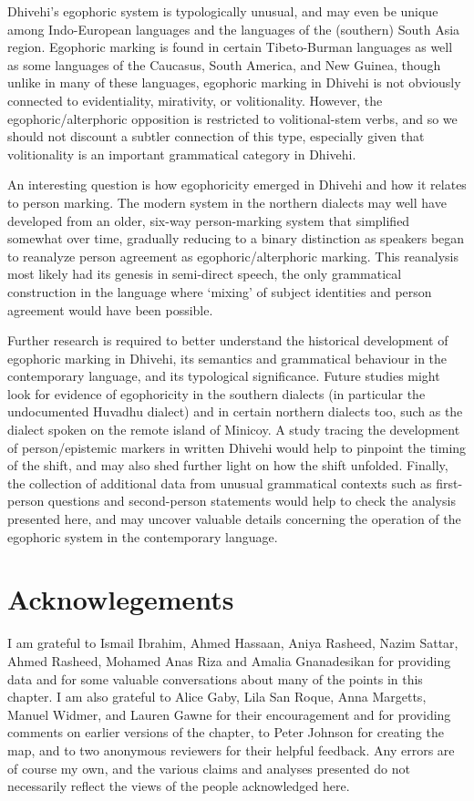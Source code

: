 \documentclass[output=paper]{langsci/langscibook}
\begin{document}
Dhivehi’s egophoric system is typologically unusual, and may even be unique among Indo-European languages and the languages of the (southern) South Asia region. Egophoric marking is found in certain Tibeto-Burman languages as well as some languages of the Caucasus, South America, and New Guinea, though unlike in many of these languages, egophoric marking in Dhivehi is not obviously connected to evidentiality, mirativity, or volitionality. However, the egophoric/alterphoric opposition is restricted to volitional-stem verbs, and so we should not discount a subtler connection of this type, especially given that volitionality is an important grammatical category in Dhivehi.

An interesting question is how egophoricity emerged in Dhivehi and how it relates to person marking. The modern system in the northern dialects may well have developed from an older, six-way person-marking system that simplified somewhat over time, gradually reducing to a binary distinction as speakers began to reanalyze person agreement as egophoric/alterphoric marking. This reanalysis most likely had its genesis in semi-direct speech, the only grammatical construction in the language where ‘mixing’ of subject identities and person agreement would have been possible. 

Further research is required to better understand the historical development of egophoric marking in Dhivehi, its semantics and grammatical behaviour in the contemporary language, and its typological significance. Future studies might look for evidence of egophoricity in the southern dialects (in particular the undocumented Huvadhu dialect) and in certain northern dialects too, such as the dialect spoken on the remote island of Minicoy. A study tracing the development of person/epistemic markers in written Dhivehi would help to pinpoint the timing of the shift, and may also shed further light on how the shift unfolded. Finally, the collection of additional data from unusual grammatical contexts such as first-person questions and second-person statements would help to check the analysis presented here, and may uncover valuable details concerning the operation of the egophoric system in the contemporary language.


\section*{Acknowlegements}

I am grateful to Ismail Ibrahim, Ahmed Hassaan, Aniya Rasheed, Nazim Sattar, Ahmed Rasheed, Mohamed Anas Riza and Amalia Gnanadesikan for providing data and for some valuable conversations about many of the points in this chapter. I am also grateful to Alice Gaby, Lila San Roque, Anna Margetts, Manuel Widmer, and Lauren Gawne for their encouragement and for providing comments on earlier versions of the chapter, to Peter Johnson for creating the map, and to two anonymous reviewers for their helpful feedback. Any errors are of course my own, and the various claims and analyses presented do not necessarily reflect the views of the people acknowledged here.
\end{document}

